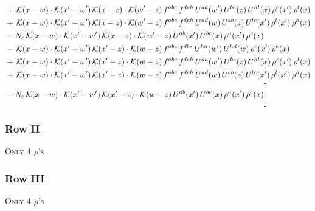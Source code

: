 \documentclass[9pt]{article}
\numberwithin{equation}{section}
\begin{document}
\begin{align}
&+\,\mathcal{K}(x-w)\cdot\mathcal{K}(x'-w')\,\mathcal{K}(x-z)\cdot\mathcal{K}(w'-z)\,f^{abc}\,f^{deh}\,U^{da}(w')\,U^{be}(z)\,U^{hl}(x)\,\rho^{c}(x')\,\rho^{l}(x)\notag\\
&+\,\mathcal{K}(x-w)\cdot\mathcal{K}(x'-w')\,\mathcal{K}(x-z)\cdot\mathcal{K}(w'-z)\,f^{abc}\,f^{deh}\,U^{ad}(w)\,U^{eb}(z)\,U^{lc}(x')\,\rho^{l}(x')\,\rho^{h}(x)\notag\\
&-N_{c}\,\mathcal{K}(x-w)\cdot\mathcal{K}(x'-w')\,\mathcal{K}(x-z)\cdot\mathcal{K}(w'-z)\,U^{ab}(x')\,U^{bc}(x)\,\rho^{a}(x')\,\rho^{c}(x)\notag\\
&-\,\mathcal{K}(x-w)\cdot\mathcal{K}(x'-w')\,\mathcal{K}(x'-z)\cdot\mathcal{K}(w-z)\,f^{abc}\,f^{dbe}\,U^{ha}(w')\,U^{hd}(w)\,\rho^{c}(x')\,\rho^{e}(x)\notag\\
&+\,\mathcal{K}(x-w)\cdot\mathcal{K}(x'-w')\,\mathcal{K}(x'-z)\cdot\mathcal{K}(w-z)\,f^{abc}\,f^{deh}\,U^{da}(w')\,U^{be}(z)\,U^{hl}(x)\,\rho^{c}(x')\,\rho^{l}(x)\notag\\
&+\,\mathcal{K}(x-w)\cdot\mathcal{K}(x'-w')\,\mathcal{K}(x'-z)\cdot\mathcal{K}(w-z)\,f^{abc}\,f^{deh}\,U^{ad}(w)\,U^{eb}(z)\,U^{lc}(x')\,\rho^{l}(x')\,\rho^{h}(x)\notag\\
&-N_{c}\,\mathcal{K}(x-w)\cdot\mathcal{K}(x'-w')\,\mathcal{K}(x'-z)\cdot\mathcal{K}(w-z)\,U^{ab}(x')\,U^{bc}(x)\,\rho^{a}(x')\,\rho^{c}(x)\Bigg]
\end{align}     
\subsubsection{Row II}
\textsc{Only 4 $\rho$'s}
\subsubsection{Row III}
\textsc{Only 4 $\rho$'s}
\end{document}
